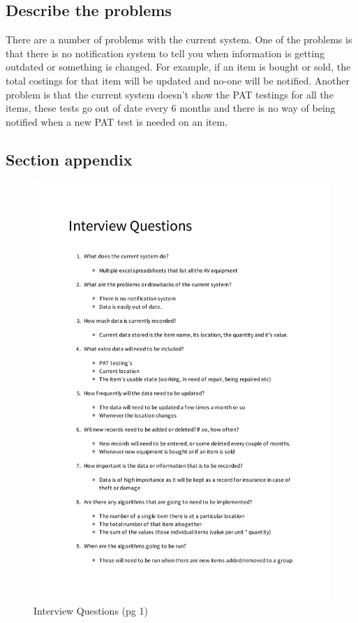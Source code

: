 \documentclass[12pt]{report}
\begin{document}
\subsection{Describe the problems}

There are a number of problems with the current system. One of the problems is that there is no notification system to tell you when information is getting outdated or something is changed. For example, if an item is bought or sold, the total costings for that item will be updated and no-one will be notified. Another problem is that the current system doesn't show the PAT testings for all the items, these tests go out of date every 6 months and there is no way of being notified when a new PAT test is needed on an item.

\newpage

\subsection{Section appendix}

\begin{figure}[H]
    \caption{Interview Questions (pg 1)} \label{fig: Interview Questions}
    \includegraphics[page=1,width=\textwidth]{./Interview/interview_questions.pdf}
\end{figure}
\end{document}
